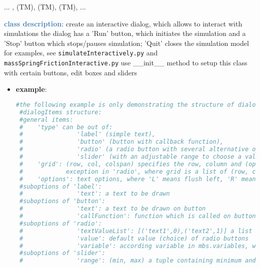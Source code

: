 \begin{itemize}[leftmargin=1.4cm]
\begin{itemize}[leftmargin=1.4cm]
\begin{itemize}[leftmargin=0.5cm]
\begin{itemize}[leftmargin=1.4cm]
\begin{itemize}[leftmargin=1.4cm]
\begin{itemize}[leftmargin=0.5cm]
\begin{itemize}[leftmargin=1.4cm]
\begin{itemize}[leftmargin=0.5cm]
\begin{itemize}[leftmargin=1.4cm]
\begin{itemize}[leftmargin=1.4cm]
 ...
, 
 (TM), 
 (TM), 
 (TM), 
 ...
\ei

%
\noindent\textcolor{steelblue}{{\bf class description}}:  create an interactive dialog, which allows to interact with simulations
the dialog has a 'Run' button, which initiates the simulation and a 'Stop' button which stops/pauses simulation; 'Quit' closes the simulation model
for examples, see \texttt{simulateInteractively.py} and \texttt{massSpringFrictionInteractive.py}
use \_\_init\_\_ method to setup this class with certain buttons, edit boxes and sliders
\setlength{\itemindent}{0.7cm}
\begin{itemize}[leftmargin=0.7cm]
  \item[--]  {\bf example}: \vspace{-12pt}\ei\begin{lstlisting}[language=Python, xleftmargin=36pt]
#the following example is only demonstrating the structure of dialogItems and plots
 #dialogItems structure:
 #general items:
 #    'type' can be out of:
 #               'label' (simple text),
 #               'button' (button with callback function),
 #               'radio' (a radio button with several alternative options),
 #               'slider' (with an adjustable range to choose a value)
 #    'grid': (row, col, colspan) specifies the row, column and (optionally) the span of columns the item is placed at;
 #            exception in 'radio', where grid is a list of (row, col) for every choice
 #    'options': text options, where 'L' means flush left, 'R' means flush right
 #suboptions of 'label':
 #               'text': a text to be drawn
 #suboptions of 'button':
 #               'text': a text to be drawn on button
 #               'callFunction': function which is called on button-press
 #suboptions of 'radio':
 #               'textValueList': [('text1',0),('text2',1)] a list of texts with according values
 #               'value': default value (choice) of radio buttons
 #               'variable': according variable in mbs.variables, which is set to current radio button value
 #suboptions of 'slider':
 #               'range': (min, max) a tuple containing minimum and maximum value of slider

\end{lstlisting}
\end{itemize}
\end{itemize}
\end{itemize}
\end{itemize}
\end{itemize}
\end{itemize}
\end{itemize}
\end{itemize}
\end{itemize}
\end{itemize}
\end{itemize}
